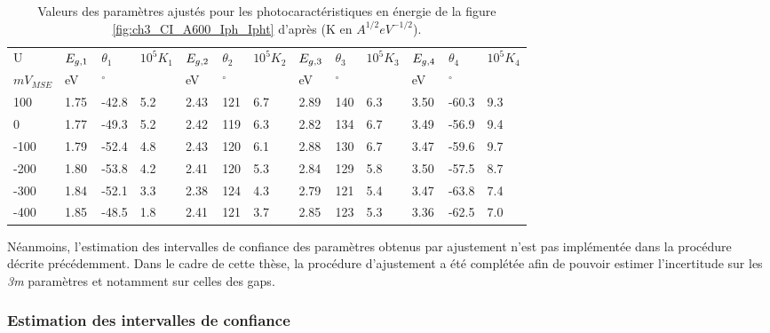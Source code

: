 \begin{refsection}
    \begin{table}[H] 
        \centering
        \begin{footnotesize}
        \begin{tabular}{l|lll|lll|lll|lll}
        \toprule
            U & $E_{g,1}$ & $\theta_1$ & $10^{5}K_1$ & $E_{g,2}$ & $\theta_2$ & $10^{5}K_2$ & $E_{g,3}$ & $\theta_3$ &
            $10^{5}K_3$ & $E_{g,4}$ & $\theta_4$ & $10^{5}K_4$\\
            $mV_{MSE}$ & eV & $^{\circ}$ &  & eV & $^{\circ}$ &  & eV & $^{\circ}$ &  & eV & $^{\circ}$ & \\
        \midrule
        100 & 1.75 & -42.8 & 5.2 & 2.43 & 121 & 6.7 & 2.89 & 140 & 6.3 & 3.50 & -60.3 & 9.3 \\\hline
        0 & 1.77 & -49.3 & 5.2 & 2.42 & 119 & 6.3 & 2.82 & 134 & 6.7 & 3.49 & -56.9 & 9.4 \\\hline
        -100 & 1.79 & -52.4 & 4.8 & 2.43 & 120 & 6.1 & 2.88 & 130 & 6.7 & 3.47 & -59.6 & 9.7 \\\hline
        -200 & 1.80 & -53.8 & 4.2 & 2.41 & 120 & 5.3 & 2.84 & 129 & 5.8 & 3.50 & -57.5 & 8.7 \\\hline
        -300 & 1.84 & -52.1 & 3.3 & 2.38 & 124 & 4.3 & 2.79 & 121 & 5.4 & 3.47 & -63.8 & 7.4 \\\hline
        -400 & 1.85 & -48.5 & 1.8 & 2.41 & 121 & 3.7 & 2.85 & 123 & 5.3 & 3.36 & -62.5 & 7.0 \\        
        \bottomrule
        \end{tabular}
        \end{footnotesize}
        \caption[Valeurs des paramètres ajustés pour les photocaractéristiques (figure
        \ref{fig:ch3_CI_A600_Iph_Ipht}).]
        {Valeurs des paramètres ajustés pour les photocaractéristiques en énergie
        de la figure \ref{fig:ch3_CI_A600_Iph_Ipht} d'après \citet{Petit2013} (K en $A^{1/2} eV^{-1/2}$).}
        \label{tab:ch3_fitted_parameters_A600}
    \end{table}

    Néanmoins, l'estimation des intervalles de confiance des paramètres obtenus par ajustement n'est pas implémentée dans la
    procédure décrite précédemment. Dans le cadre de cette thèse, la procédure d'ajustement a été complétée afin de pouvoir estimer
    l'incertitude sur les \emph{3m} paramètres et notamment sur celles des gaps.

   
    \subsubsection{Estimation des intervalles de confiance}\label{subsubsec:ch3_confidence_interval}


\end{refsection}
